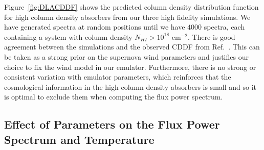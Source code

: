\documentclass[a4paper,11pt]{article}
\begin{document}
Figure~\ref{fig:DLACDDF} shows the predicted column density distribution function for high column density absorbers from our three high fidelity simulations. We have generated spectra at random positions until we have $4000$ spectra, each containing a system with column density $N_{HI} > 10^{18}$ cm$^{-2}$. There is good agreement between the simulations and the observed CDDF from Ref.~\cite{2021MNRAS.507..704H}. This can be taken as a strong prior on the supernova wind parameters and justifies our choice to fix the wind model in our emulator. Furthermore, there is no strong or consistent variation with emulator parameters, which reinforces that the cosmological information in the high column density absorbers is small and so it is optimal to exclude them when computing the flux power spectrum.

\subsection{Effect of Parameters on the Flux Power Spectrum and Temperature}
\label{sec:singleparams}
\end{document}
